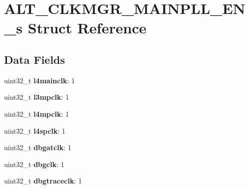 \hypertarget{structALT__CLKMGR__MAINPLL__EN__s}{}\section{A\+L\+T\+\_\+\+C\+L\+K\+M\+G\+R\+\_\+\+M\+A\+I\+N\+P\+L\+L\+\_\+\+E\+N\+\_\+s Struct Reference}
\label{structALT__CLKMGR__MAINPLL__EN__s}
\subsection*{Data Fields}
\begin{DoxyCompactItemize}
\item 
\mbox{\label{structALT__CLKMGR__MAINPLL__EN__s_a8dee21da76ab08840764d095e11e00fa}} 
uint32\+\_\+t {\bfseries l4mainclk}\+: 1
\item 
\mbox{\label{structALT__CLKMGR__MAINPLL__EN__s_a7828268034700186c940f2f86cef79ab}} 
uint32\+\_\+t {\bfseries l3mpclk}\+: 1
\item 
\mbox{\label{structALT__CLKMGR__MAINPLL__EN__s_afe2e4796b421138a96953957c600e785}} 
uint32\+\_\+t {\bfseries l4mpclk}\+: 1
\item 
\mbox{\label{structALT__CLKMGR__MAINPLL__EN__s_ac365a6f134dac553932e9a299d69fe4c}} 
uint32\+\_\+t {\bfseries l4spclk}\+: 1
\item 
\mbox{\label{structALT__CLKMGR__MAINPLL__EN__s_ab00cc1abc8d26dc28e8b7948cb266f1b}} 
uint32\+\_\+t {\bfseries dbgatclk}\+: 1
\item 
\mbox{\label{structALT__CLKMGR__MAINPLL__EN__s_a91c92836f9d946dbafe70353fde22726}} 
uint32\+\_\+t {\bfseries dbgclk}\+: 1
\item 
\mbox{\label{structALT__CLKMGR__MAINPLL__EN__s_a637d811209085a17c5455ac7ab7dcee6}} 
uint32\+\_\+t {\bfseries dbgtraceclk}\+: 1
\item 
\mbox{\label{structALT__CLKMGR__MAINPLL__EN__s_a0f1346a314261ff8e4b56378292d9359}} 

\end{DoxyCompactItemize}
